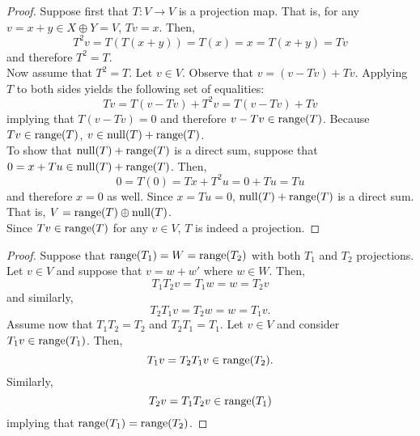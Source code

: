 \documentclass[../AlgebraQualSolutions.tex]{subfiles}
\begin{document}
	\begin{proof}
		Suppose first that $T: V \to V$ is a projection map. That is, for any $v = x + y \in X \oplus Y = V$, $Tv = x$. Then,
			\[T^2v = T(T(x+y)) = T(x) = x = T(x+y) = Tv\]
		and therefore $T^2 = T$.\\

		Now assume that $T^2=T$. Let $v  \in V$. Observe that $v = (v - Tv) + Tv$. Applying $T$ to both sides yields the following set of equalities:
			\[Tv = T(v-Tv) + T^2v = T(v-Tv) + Tv\]
		implying that $T(v-Tv) =0$ and therefore $v-Tv \in \mathrm{range}(T)$. Because $Tv \in \mathrm{range}(T)$, $v \in \mathrm{null}(T) + \mathrm{range}(T)$.\\
		
		To show that $\mathrm{null}(T) + \mathrm{range}(T)$ is a direct sum, suppose that $0 = x + Tu \in \mathrm{null}(T) + \mathrm{range}(T)$. Then,	
			\[0 = T(0) = Tx + T^2u = 0 + Tu = Tu \]
		and therefore $x = 0$ as well. Since $x = Tu = 0$, $\mathrm{null}(T) + \mathrm{range}(T)$ is a direct sum. That is, $V = \mathrm{range}(T) \oplus \mathrm{null}(T)$.\\

		Since $Tv \in \mathrm{range}(T)$ for any $v \in V$, $T$ is indeed a projection.
	\end{proof}

	\begin{proof}
		Suppose that $\mathrm{range}(T_1) = W = \mathrm{range}(T_2)$ with both $T_1$ and $T_2$ projections. Let $v \in V$ and suppose that $v = w + w'$ where $w \in W$. Then,
			\[T_1T_2v = T_1w = w = T_2v\]
		and similarly,
			\[T_2T_1v = T_2w = w = T_1v.\]
		Assume now that $T_1T_2 = T_2$ and $T_2T_1 = T_1$. Let $v \in V$ and consider $T_1v \in \mathrm{range}(T_1)$. Then,
			\[T_1v = T_2T_1v \in \mathrm{range}(T_2).\]
		Similarly,
			\[T_2v = T_1T_2v \in \mathrm{range}(T_1) \]
		implying that $\mathrm{range}(T_1) = \mathrm{range}(T_2)$.
	\end{proof}
\end{document}
